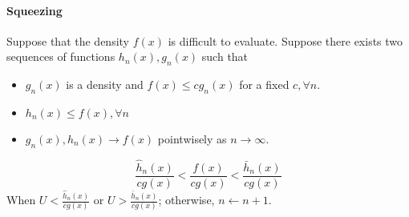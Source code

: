 \paragraph{Squeezing}
Suppose that the density $f(x)$ is difficult to evaluate.
Suppose there exists two sequences of functions $h_n(x),g_n(x)$ such that
\begin{itemize}
\item
$g_n(x)$ is a density and $f(x)\le cg_n(x)$ for a fixed $c,\forall n$.
\item
$h_n(x)\le f(x),\forall n$
\item
$g_n(x),h_n(x)\to f(x)$ pointwisely as $n\to\infty$.
\end{itemize}
\[
\frac{\hat{h}_n(x)}{cg(x)}
<
\frac{f(x)}{cg(x)}
<
\frac{\bar{h}_n(x)}{cg(x)}
\]
When $U<\frac{\hat{h}_n(x)}{cg(x)}$ or $U>\frac{\bar{h}_n(x)}{cg(x)}$;
otherwise, $n\leftarrow n+1$.







